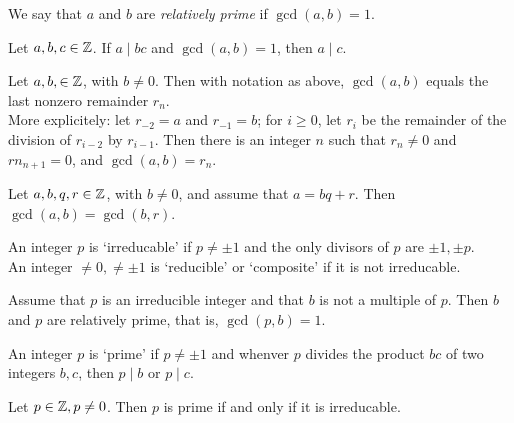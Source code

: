\documentclass[../Aluffi_Algebra.tex]{subfiles}
\begin{document}
\begin{defn}
    We say that \(a\) and \(b\) are \emph{relatively prime} if \(\gcd(a,b) = 1\).
\end{defn}

\begin{cor}
    Let \(a, b, c \in \mathbb{Z}\). If \(a \mid bc\) and \(\gcd(a,b) = 1\), then \(a \mid c\).
\end{cor}


\begin{thm}
    Let \(a, b, \in \mathbb{Z}\), with \(b \neq 0\). Then with notation as above,
    \(\gcd(a, b)\) equals the last nonzero remainder \(r_n\).\\
    More explicitely: let \(r_{-2} = a\) and \(r_{-1} = b\); for \(i \geq 0\), let \(r_i\) be the remainder of the
    division of \(r_{i-2}\) by \(r_{i-1}\). Then there is an integer \(n\) such
    that \(r_n \neq 0\) and \(rn_{n+1} = 0\), and \(\gcd(a,b) = r_n\).
\end{thm}

\begin{lem}
    Let \(a, b, q, r \in \mathbb{Z}\), with \(b \neq 0\), and assume that \(a = bq + r\). Then \(\gcd(a,b) = \gcd(b,r)\).
\end{lem}


\begin{defn}
    An integer \(p\) is `irreducable' if \(p \neq \pm 1\) and the only divisors of \(p\) are \(\pm 1, \pm p\).\\
    An integer \(\neq 0, \neq \pm 1\) is `reducible' or `composite' if it is not irreducable.
\end{defn}

\begin{lem}
    Assume that \(p\) is an irreducible integer and that \(b\) is not a multiple of \(p\). Then \(b\) and \(p\)
    are relatively prime, that is, \(\gcd(p,b) = 1\).
\end{lem}

\begin{defn}
    An integer \(p\) is `prime' if \(p \neq \pm 1\) and whenver \(p\) divides the product \(bc\) of two integers
    \(b,c\), then \(p \mid b\) or \(p \mid c\).
\end{defn}


\begin{thm}
    Let \(p \in \mathbb{Z}, p \neq 0\). Then \(p\) is prime if and only if it is irreducable.
\end{thm}
\end{document}
